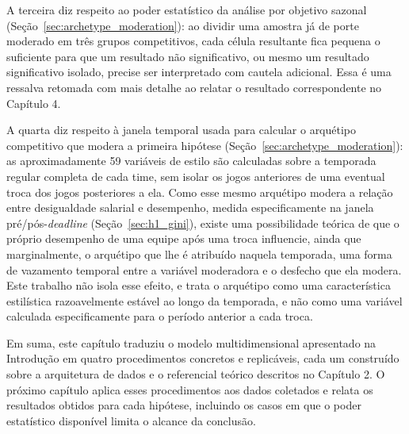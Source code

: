 A terceira diz respeito ao poder estatístico da análise por objetivo sazonal (Seção~\ref{sec:archetype_moderation}): ao dividir uma amostra já de porte moderado em três grupos competitivos, cada célula resultante fica pequena o suficiente para que um resultado não significativo, ou mesmo um resultado significativo isolado, precise ser interpretado com cautela adicional. Essa é uma ressalva retomada com mais detalhe ao relatar o resultado correspondente no Capítulo 4.

A quarta diz respeito à janela temporal usada para calcular o arquétipo competitivo que modera a primeira hipótese (Seção~\ref{sec:archetype_moderation}): as aproximadamente 59 variáveis de estilo são calculadas sobre a temporada regular completa de cada time, sem isolar os jogos anteriores de uma eventual troca dos jogos posteriores a ela. Como esse mesmo arquétipo modera a relação entre desigualdade salarial e desempenho, medida especificamente na janela pré/pós-\textit{deadline} (Seção~\ref{sec:h1_gini}), existe uma possibilidade teórica de que o próprio desempenho de uma equipe após uma troca influencie, ainda que marginalmente, o arquétipo que lhe é atribuído naquela temporada, uma forma de vazamento temporal entre a variável moderadora e o desfecho que ela modera. Este trabalho não isola esse efeito, e trata o arquétipo como uma característica estilística razoavelmente estável ao longo da temporada, e não como uma variável calculada especificamente para o período anterior a cada troca.

\vspace{1em} %

Em suma, este capítulo traduziu o modelo multidimensional apresentado na Introdução em quatro procedimentos concretos e replicáveis, cada um construído sobre a arquitetura de dados e o referencial teórico descritos no Capítulo 2. O próximo capítulo aplica esses procedimentos aos dados coletados e relata os resultados obtidos para cada hipótese, incluindo os casos em que o poder estatístico disponível limita o alcance da conclusão.
